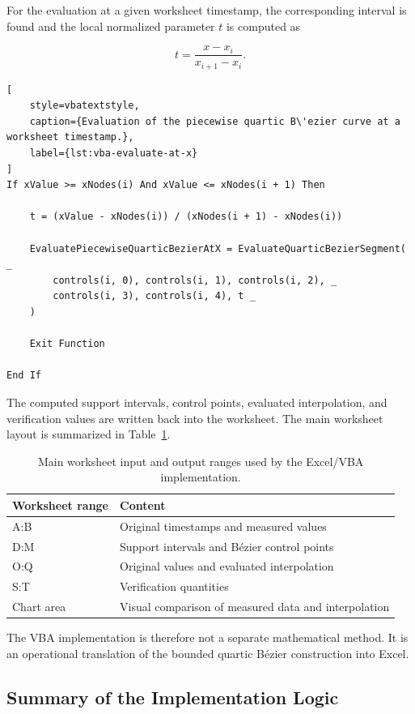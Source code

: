 \documentclass[12pt,a4paper]{article}
\begin{document}
For the evaluation at a given worksheet timestamp, the corresponding interval
is found and the local normalized parameter \(t\) is computed as

\[
t=\frac{x-x_i}{x_{i+1}-x_i}.
\]

\begin{lstlisting}[
    style=vbatextstyle,
    caption={Evaluation of the piecewise quartic B\'ezier curve at a worksheet timestamp.},
    label={lst:vba-evaluate-at-x}
]
If xValue >= xNodes(i) And xValue <= xNodes(i + 1) Then

    t = (xValue - xNodes(i)) / (xNodes(i + 1) - xNodes(i))

    EvaluatePiecewiseQuarticBezierAtX = EvaluateQuarticBezierSegment( _
        controls(i, 0), controls(i, 1), controls(i, 2), _
        controls(i, 3), controls(i, 4), t _
    )

    Exit Function

End If
\end{lstlisting}

The computed support intervals, control points, evaluated interpolation, and
verification values are written back into the worksheet. The main worksheet
layout is summarized in Table~\ref{tab:vba-output-ranges}.

\begin{table}[H]
\centering
\begin{tabular}{ll}
\toprule
Worksheet range & Content \\
\midrule
A:B & Original timestamps and measured values \\
D:M & Support intervals and B\'ezier control points \\
O:Q & Original values and evaluated interpolation \\
S:T & Verification quantities \\
Chart area & Visual comparison of measured data and interpolation \\
\bottomrule
\end{tabular}
\caption{Main worksheet input and output ranges used by the Excel/VBA implementation.}
\label{tab:vba-output-ranges}
\end{table}

The VBA implementation is therefore not a separate mathematical method. It is
an operational translation of the bounded quartic B\'ezier construction into
Excel.

\subsection{Summary of the Implementation Logic}
\end{document}
